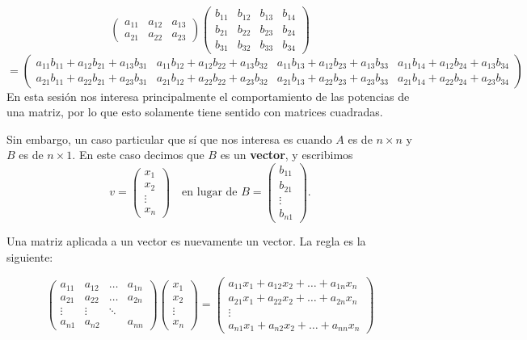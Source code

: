 $$\left(\begin{array}{ccc}
a_{11}&a_{12}&a_{13} \\
a_{21}&a_{22}&a_{23} 
\end{array}\right)
\left(\begin{array}{cccc}
b_{11}&b_{12}&b_{13}&b_{14} \\
b_{21}&b_{22}&b_{23}&b_{24} \\
b_{31}&b_{32}&b_{33}&b_{34}
\end{array}\right)$$ 
$$=
\left(\begin{array}{cccc}
a_{11}b_{11}+a_{12}b_{21}+a_{13}b_{31} & a_{11}b_{12}+a_{12}b_{22}+a_{13}b_{32} & a_{11}b_{13}+a_{12}b_{23}+a_{13}b_{33} & a_{11}b_{14}+a_{12}b_{24}+a_{13}b_{34} \\
a_{21}b_{11}+a_{22}b_{21}+a_{23}b_{31} & a_{21}b_{12}+a_{22}b_{22}+a_{23}b_{32} & a_{21}b_{13}+a_{22}b_{23}+a_{23}b_{33} & a_{21}b_{14}+a_{22}b_{24}+a_{23}b_{34}
\end{array}\right)$$
En esta sesión nos interesa principalmente el comportamiento de las potencias de una matriz, por lo que esto solamente tiene sentido con matrices cuadradas.

Sin embargo, un caso particular que sí que nos interesa es cuando $A$ es de $n\times n$ y $B$ es de $n\times 1$. En este caso decimos que $B$ es un {\bf vector}, y escribimos $$v=\left(\begin{array}{c}
    x_{1}\\
    x_{2}\\
    \vdots \\
    x_{n}
\end{array} \right)\quad \text{en lugar de } B=\left(\begin{array}{c}
    b_{11}\\
    b_{21}\\
    \vdots \\
    b_{n1}
\end{array} \right).$$

Una matriz aplicada a un vector es nuevamente un vector. La regla es la siguiente:

$$ \left(\begin{array}{cccc}
    a_{11}& a_{12} & \dots & a_{1n} \\
    a_{21}& a_{22} & \dots &  a_{2n}\\

    \vdots& \vdots &\ddots &  \\
    a_{n1}& a_{n2} & & a_{nn}
\end{array} \right)
\left(\begin{array}{c}
    x_{1}\\
    x_{2}\\
    \vdots \\
    x_{n}
\end{array} \right) 
=
\left(\begin{array}{c}
    a_{11}x_1+ a_{12}x_2 + \dots + a_{1n}x_n\\
    a_{21}x_1+ a_{22}x_2 + \dots + a_{2n}x_n\\
    \vdots \\
    a_{n1}x_1+ a_{n2}x_2 + \dots + a_{nn}x_n
\end{array} \right)
$$

